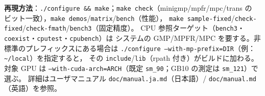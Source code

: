\documentclass[uplatex,dvipdfmx,a4paper,11pt]{jsarticle}
\newcommand{\code}[1]{\texttt{#1}}
\begin{document}
\bigskip
\noindent\textbf{再現方法}：\code{./configure \&\& make}；\code{make check}（minigmp/mpfr/mpc/trans の
ビット一致），\code{make demos}/\code{matrix}/\code{bench}（性能），
\code{make sample-fixed}/\code{check-fixed}/\code{check-fmath}/\code{bench3}（固定精度）。
CPU 参照ターゲット（\code{bench3}・\code{coexist}・\code{cputest}・\code{cpubench}）は
システムの GMP/MPFR/MPC を要する。非標準のプレフィックスにある場合は
\code{./configure --with-mp-prefix=DIR}（例：\code{\textasciitilde/local}）を指定すると，
その \code{include}/\code{lib}（rpath 付き）がビルドに加わる。対象 GPU は
\code{--with-cuda-arch=ARCH}（既定 \code{sm\_90}；GB10 の測定は \code{sm\_121}）で選ぶ。
詳細はユーザマニュアル \code{doc/manual.ja.md}（日本語）/ \code{doc/manual.md}（英語）を参照。
\end{document}
